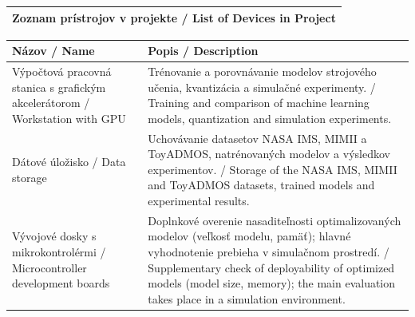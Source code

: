 \documentclass[9pt,a4paper]{extarticle}
\newcommand{\SectionTitle}[1]{\vspace{4pt}\noindent\begin{tabularx}{\textwidth}{|>{\columncolor{shade}}X|}\hline\bfseries #1 \\ \hline\end{tabularx}\vspace{-2pt}}
\begin{document}
\SectionTitle{Zoznam prístrojov v projekte / List of Devices in Project}
\begin{longtable}{|>{\RaggedRight\arraybackslash}p{50mm}|p{122mm}|}\hline
\rowcolor{shade} Názov / Name & Popis / Description\\\hline\endhead
Výpočtová pracovná stanica s grafickým akcelerátorom / Workstation with GPU & Trénovanie a porovnávanie modelov strojového učenia, kvantizácia a simulačné experimenty. / Training and comparison of machine learning models, quantization and simulation experiments.\\\hline
Dátové úložisko / Data storage & Uchovávanie datasetov NASA IMS, MIMII a ToyADMOS, natrénovaných modelov a výsledkov experimentov. / Storage of the NASA IMS, MIMII and ToyADMOS datasets, trained models and experimental results.\\\hline
Vývojové dosky s mikrokontrolérmi / Microcontroller development boards & Doplnkové overenie nasaditeľnosti optimalizovaných modelov (veľkosť modelu, pamäť); hlavné vyhodnotenie prebieha v simulačnom prostredí. / Supplementary check of deployability of optimized models (model size, memory); the main evaluation takes place in a simulation environment.\\\hline
\end{longtable}
\clearpage
\end{document}
